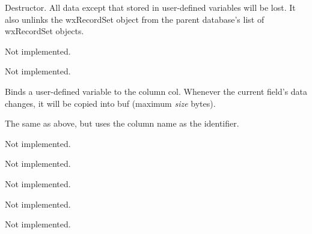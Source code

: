 
Destructor. All data except that stored in user-defined variables will be lost.
It also unlinks the wxRecordSet object from the parent database's list of
wxRecordSet objects.
 


Not implemented.



Not implemented.



Binds a user-defined variable to the column col. Whenever the current field's
data changes, it will be copied into buf (maximum {\it size} bytes).


The same as above, but uses the column name as the identifier.



Not implemented.



Not implemented.



Not implemented.



Not implemented.



Not implemented.




